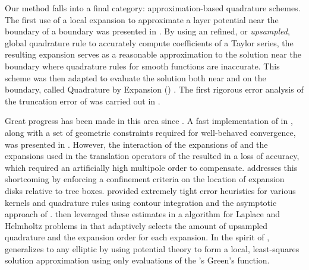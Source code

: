 Our method falls into a final category: approximation-based quadrature schemes. 
The first use of a local expansion to approximate a layer potential near the boundary of a \twod boundary was presented in \cite{barnett2014evaluation}.
By using an refined, or \textit{upsampled}, global quadrature rule to accurately compute coefficients of a Taylor series, the resulting expansion serves as a reasonable approximation to the solution near the boundary where quadrature rules for smooth functions are inaccurate.
This scheme was then adapted to evaluate the solution both near and on the boundary, called Quadrature by Expansion (\qbx) \cite{KBGN}. 
The first rigorous error analysis of the truncation error of \qbx was carried out in \cite{EGK}.

Great progress has been made in this area since \cite{KBGN}.
A fast implementation of \qbx in \twod, along with a set of geometric constraints required for well-behaved convergence, was presented in \cite{RKO}.
However, the interaction of the expansions of \qbx and the expansions used in the translation operators of the \fmm resulted in a loss of accuracy, which required an artificially high multipole order to compensate.
\cite{wala2018fast} addresses this shortcoming by enforcing a confinement criteria on the location of expansion disks relative to \fmm tree boxes.
\cite{aT2} provided extremely tight error heuristics for various kernels and quadrature rules using contour integration and the asymptotic approach of \cite{elliott2008clenshaw}.
\cite{aT1} then leveraged these estimates in a \qbx algorithm for Laplace and Helmholtz problems in \twod that adaptively selects the amount of upsampled quadrature and the expansion order for each \qbx expansion.
In the spirit of \cite{ying2004kernel}, \cite{RBZ} generalizes \qbx to any elliptic \pde by using potential theory to form a local, least-squares solution approximation using only evaluations of the \pde's Green's function.

